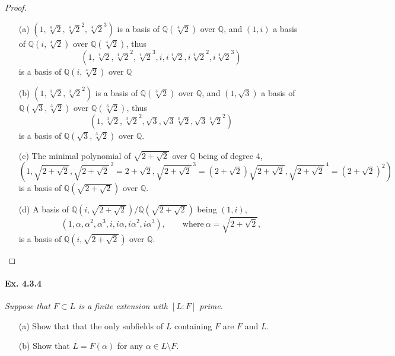 \documentclass[11pt,a4paper]{article}
\newcommand{\Q}{\mathbb{Q}}
\begin{document}
\begin{proof}
\begin{enumerate}
\item[(a)]
$(1,\sqrt[4]{2},\sqrt[4]{2}^2,\sqrt[4]{2}^3)$ is a basis of $\Q(\sqrt[4]{2})$ over $\Q$, and $(1,i)$ a basis of $\Q(i,\sqrt[4]{2})$ over $\Q(\sqrt[4]{2})$, thus
$$(1,\sqrt[4]{2},\sqrt[4]{2}^2,\sqrt[4]{2}^3, i, i\sqrt[4]{2},i\sqrt[4]{2}^2,i\sqrt[4]{2}^3)$$
is a basis of $\Q(i,\sqrt[4]{2})$ over $\Q$

\item[(b)]
$(1,\sqrt[3]{2},\sqrt[3]{2}^2)$ is a basis of $\Q(\sqrt[3]{2})$ over $\Q$, and $(1,\sqrt{3})$ a basis of $\Q(\sqrt{3},\sqrt[3]{2})$ over $\Q(\sqrt[3]{2})$, thus
$$ ( 1,\sqrt[3]{2},\sqrt[3]{2}^2, \sqrt{3},\sqrt{3}\sqrt[3]{2},\sqrt{3}\sqrt[3]{2}^2)$$
is a basis of $\Q(\sqrt{3},\sqrt[3]{2})$ over $\Q$.

\item[(c)] The minimal polynomial of $\sqrt{2+\sqrt{2}}$ over $\Q$ being of degree 4, 
$$\left(1,\sqrt{2+\sqrt{2}},\sqrt{2+\sqrt{2}}^{\, 2}= 2+\sqrt{2}, \sqrt{2+\sqrt{2}}^{\, 3} =(2+\sqrt{2})\sqrt{2+\sqrt{2}}, \sqrt{2+\sqrt{2}}^{\,4}= (2+\sqrt{2})^2 \right)$$
is a basis of $\Q\left(\sqrt{2+\sqrt{2}}\right)$ over $\Q$.

\item[(d)]
A basis of $\Q\left(i,\sqrt{2+\sqrt{2}}\right)/ \Q\left(\sqrt{2+\sqrt{2}}\right)$ being $(1,i)$, 
$$(1,\alpha,\alpha^2,\alpha^3,i,i\alpha,i\alpha^2,i\alpha^3),\qquad \mathrm{where}\ \alpha = \sqrt{2+\sqrt{2}},$$
is a basis of $\Q\left(i,\sqrt{2+\sqrt{2}}\right)$ over $\Q$.

\end{enumerate}
\end{proof}

\paragraph{Ex. 4.3.4}

{\it Suppose that $F\subset L$ is a finite extension with $[L:F]$ prime.
\begin{enumerate}
\item[(a)] Show that that the only subfields of $L$ containing $F$ are $F$ and $L$.
\item[(b)] Show that $L = F(\alpha)$ for any $\alpha \in L \setminus F$.
\end{enumerate}
}
\end{document}
